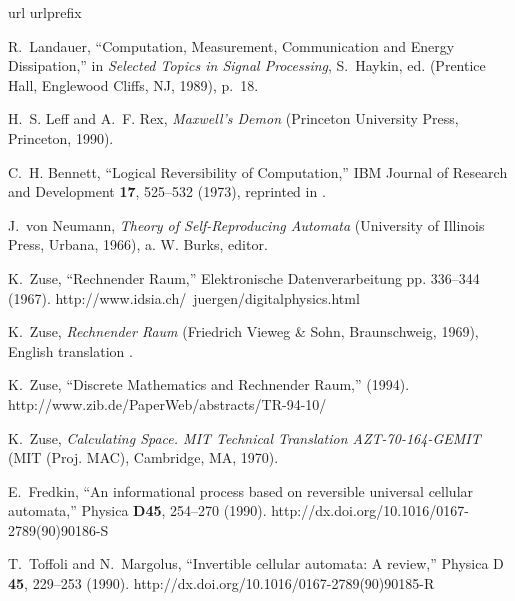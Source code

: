\documentclass[pre,amssymb,showpacs,showkeys,preprint]{revtex4}
\begin{document}
%
%


\begin{thebibliography}{10}
\newcommand{\enquote}[1]{``#1''}
\expandafter\ifx\csname url\endcsname\relax
  \def\url#1{{#1}}\fi
\expandafter\ifx\csname urlprefix\endcsname\relax\def\urlprefix{}\fi

R.~Landauer, \enquote{Computation, Measurement, Communication and Energy
  Dissipation,} in {\em Selected Topics in Signal Processing\/}, S.~Haykin, ed.
   (Prentice Hall, Englewood Cliffs, NJ, 1989), p.~18.

H.~S. Leff and A.~F. Rex, {\em Maxwell's Demon\/} (Princeton University Press,
  Princeton, 1990).

C.~H. Bennett, \enquote{Logical Reversibility of Computation,} IBM Journal of
  Research and Development {\bf 17}, 525--532 (1973), reprinted in \cite[pp.
  197-204]{maxwell-demon}.

J.~von Neumann, {\em Theory of Self-Reproducing Automata\/} (University of
  Illinois Press, Urbana, 1966), a. W. Burks, editor.

K.~Zuse, \enquote{{R}echnender {R}aum,} Elektronische Datenverarbeitung pp.
  336--344 (1967).
\newline http://www.idsia.ch/~juergen/digitalphysics.html

K.~Zuse, {\em {R}echnender {R}aum\/} (Friedrich Vieweg \& Sohn, Braunschweig,
  1969), {E}nglish translation \cite{zuse-70}.

K.~Zuse, \enquote{Discrete Mathematics and {R}echnender {R}aum,}  (1994).
\newline http://www.zib.de/PaperWeb/abstracts/TR-94-10/

K.~Zuse, {\em Calculating Space. MIT Technical Translation AZT-70-164-GEMIT\/}
  (MIT (Proj. MAC), Cambridge, MA, 1970).

E.~Fredkin, \enquote{An informational process based on reversible universal
  cellular automata,} Physica {\bf D45}, 254--270 (1990).
\newline http://dx.doi.org/10.1016/0167-2789(90)90186-S

T.~Toffoli and N.~Margolus, \enquote{Invertible cellular automata: A review,}
  Physica D {\bf 45}, 229--253 (1990).
\newline http://dx.doi.org/10.1016/0167-2789(90)90185-R


\end{thebibliography}
\end{document}
